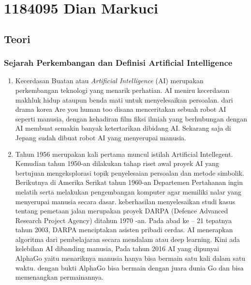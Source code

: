 

\maketitle

\section{1184095 Dian Markuci}
\subsection{Teori}
	\subsubsection{Sejarah Perkembangan dan Definisi Artiﬁcial Intelligence}      
	
	\begin{enumerate}
	    \item  Kecerdasan Buatan atau \textit{Artificial Intelligence} (AI) merupakan perkembangan teknologi yang menarik perhatian. AI meniru kecerdasan makhluk hidup ataupun benda mati untuk menyelesaikan persoalan. dari drama korea Are you human too disana menceritakan sebuah robot AI seperti manusia, dengan kehadiran film fiksi ilmiah yang berhubungan dengan AI membuat semakin banyak ketertarikan dibidang AI. Sekarang saja di Jepang sudah dibuat robot AI yang menyerupai manusia. 
	    
	    \item  Tahun 1956 merupakan kali pertama muncul istilah Artificial Intellegent. Kemudian tahun 1950-an dilakukan tahap riset awal proyek AI yang bertujuan mengeksplorasi topik penyelesaian persoalan dan metode simbolik. Berikutnya di Amerika Serikat tahun 1960-an Departemen Pertahanan ingin melatih serta melakukan pengembangan komputer agar memiliki nalar yang menyerupai manusia secara dasar.  keberhasilan menyelesaikan studi kasus tentang pemetaan jalan merupakan proyek DARPA (Defence Advanced Research Project Agency) ditahun 1970 -an. Pada abad ke – 21 tepatnya tahun 2003, DARPA menciptakan asisten pribadi cerdas.  AI menerapkan algoritma dari pembelajaran secara mendalam atau deep learning. Kini ada kelebihan AI dibanding manusia, Pada tahun 2016 AI yang dipunyai AlphaGo yaitu menariknya manusia hanya bisa bermain satu kali dalam satu waktu. dengan bukti AlphaGo bisa bermain dengan juara dunia Go dan bisa memenangkan permainannya.
	    
	\end{enumerate}
    
